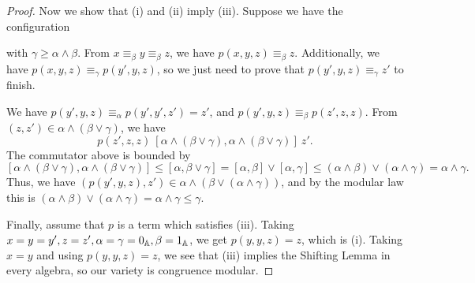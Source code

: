 \begin{appendices}
\begin{proof}
Now we show that (i) and (ii) imply (iii). Suppose we have the configuration
\begin{center}
\end{center}
with $\gamma \ge \alpha \wedge \beta$. From $x \equiv_\beta y \equiv_\beta z$, we have $p(x,y,z) \equiv_\beta z$. Additionally, we have $p(x,y,z) \equiv_\gamma p(y',y,z)$, so we just need to prove that $p(y',y,z) \equiv_\gamma z'$ to finish.

We have $p(y',y,z) \equiv_\alpha p(y',y',z') = z'$, and $p(y',y,z) \equiv_\beta p(z',z,z)$. From $(z,z') \in \alpha \wedge (\beta \vee \gamma)$, we have
\[
p(z',z,z)\ [\alpha\wedge (\beta\vee \gamma),\alpha \wedge (\beta \vee \gamma)]\ z'.
\]
The commutator above is bounded by
\[
[\alpha\wedge (\beta\vee \gamma),\alpha \wedge (\beta \vee \gamma)] \le [\alpha, \beta \vee \gamma] = [\alpha,\beta] \vee [\alpha,\gamma] \le (\alpha \wedge \beta) \vee (\alpha \wedge \gamma) = \alpha \wedge \gamma.
\]
Thus, we have $(p(y',y,z), z') \in \alpha \wedge (\beta \vee (\alpha \wedge \gamma))$, and by the modular law this is $(\alpha \wedge \beta) \vee (\alpha \wedge \gamma) = \alpha \wedge \gamma \le \gamma$.

Finally, assume that $p$ is a term which satisfies (iii). Taking $x = y = y', z = z', \alpha = \gamma = 0_{\mathbb{A}}, \beta = 1_{\mathbb{A}}$, we get $p(y,y,z) = z$, which is (i). Taking $x = y$ and using $p(y,y,z) = z$, we see that (iii) implies the Shifting Lemma in every algebra, so our variety is congruence modular.


\end{proof}
\end{appendices}
